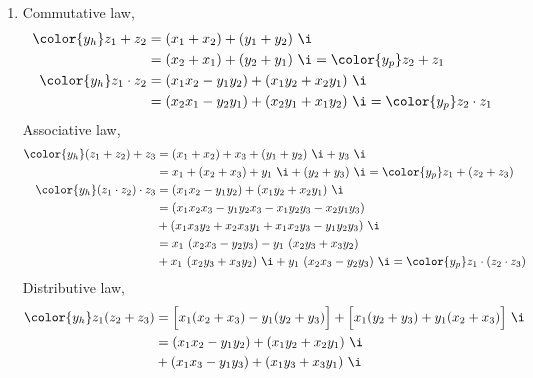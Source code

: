 \begin{enumerate}
    \item Commutative law,
          \begin{align}
              \color{y_h}z_1 + z_2     & = (x_1 + x_2) + (y_1 + y_2)\ \i             \\
                                       & = (x_2 + x_1) + (y_2 + y_1)\ \i
              =\color{y_p}  z_2 + z_1                                                \\
              \color{y_h}z_1 \cdot z_2 & = (x_1x_2 - y_1y_2) + (x_1y_2 + x_2y_1)\ \i \\
                                       & = (x_2x_1 - y_2y_1) + (x_2y_1 + x_1y_2)\ \i
              = \color{y_p} z_2 \cdot z_1
          \end{align}
          Associative law,
          \begin{align}
              \color{y_h}
              (z_1 + z_2) + z_3 & = (x_1 + x_2) + x_3 + (y_1 + y_2)\ \i + y_3\ \i   \\
                                & = x_1 + (x_2 + x_3) + y_1\ \i + (y_2 + y_3)\ \i
              = \color{y_p} z_1 + (z_2 + z_3)                                       \\
              \color{y_h}(z_1 \cdot z_2)
              \cdot z_3         & = (x_1x_2 - y_1y_2) + (x_1y_2 + x_2y_1)\ \i       \\
                                & = (x_1x_2x_3 - y_1y_2x_3 - x_1y_2y_3 - x_2y_1y_3) \\
                                & + (x_1x_3y_2 + x_2x_3y_1 + x_1x_2y_3 - y_1y_2y_3)
              \ \i                                                                  \\
                                & = x_1\ (x_2x_3 - y_2y_3) - y_1\ (x_2y_3 + x_3y_2) \\
                                & + x_1\ (x_2y_3 + x_3y_2)\ \i
              + y_1\ (x_2x_3 - y_2y_3)\ \i
              = \color{y_p} z_1 \cdot (z_2 \cdot z_3)
          \end{align}
          Distributive law,
          \begin{align}
              \color{y_h}
              z_1(z_2 + z_3) & = \Big[ x_1(x_2 + x_3) - y_1(y_2 + y_3) \Big]
              + \Big[ x_1(y_2 + y_3) + y_1(x_2 + x_3) \Big]\ \i              \\
                             & = (x_1x_2 - y_1y_2) + (x_1y_2 + x_2y_1)\ \i   \\
                             & + (x_1x_3 - y_1y_3) + (x_1y_3 + x_3y_1)\ \i   \\

\end{align}
\end{enumerate}
